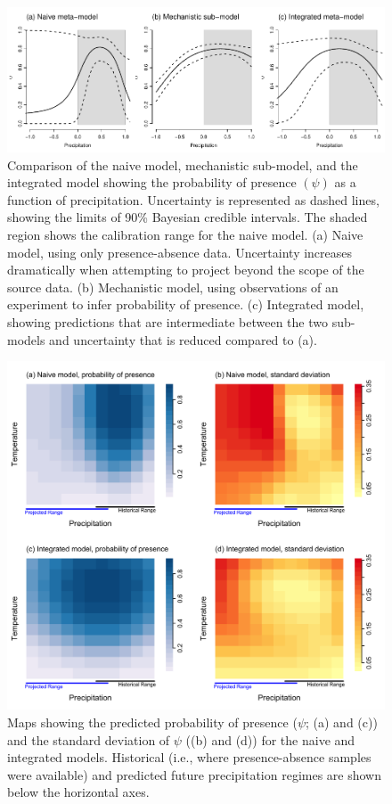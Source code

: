 \documentclass[11pt]{article}
\begin{document}
\begin{figure}[bt]
	\includegraphics{figs/ex1_precip.pdf}
	\caption{Comparison of the naive model, mechanistic sub-model, and the integrated model showing the probability of presence $(\psi)$ as a function of precipitation.
	Uncertainty is represented as dashed lines, showing the limits of 90\% Bayesian credible intervals.
	The shaded region shows the calibration range for the naive model.
	(a) Naive model, using only presence-absence data. Uncertainty increases dramatically when attempting to project beyond the scope of the source data.
	(b) Mechanistic model, using observations of an experiment to infer probability of presence.
	(c) Integrated model, showing predictions that are intermediate between the two sub-models and uncertainty that is reduced compared to (a).
	}
	\label{fig:ex1_precip}
\end{figure}


\begin{figure}[tb]
	\includegraphics[width=6.5in]{figs/ex1_map.png}
	\caption{Maps showing the predicted probability of presence (\(\psi\); (a) and (c)) and the standard deviation of \(\psi\) ((b) and (d)) for the naive and integrated models.
	Historical (i.e., where presence-absence samples were available) and predicted future precipitation regimes are shown below the horizontal axes.
}
	\label{fig:ex1_map}
\end{figure}
\end{document}

